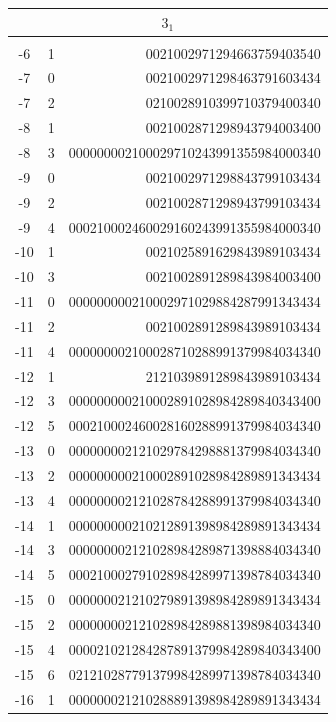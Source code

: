 \documentclass{article}
\begin{document}
\begin{supertabular}[h]{c c r}
\hline
{}     \\
\hline \\[-3pt]
-6    & 1  & 0021002971294663759403540             \\
-7    & 0  & 0021002971298463791603434             \\
-7    & 2  & 0210028910399710379400340             \\
-8    & 1  & 0021002871298943794003400             \\
-8    & 3  & 000000002100029710243991355984000340  \\
-9    & 0  & 0021002971298843799103434             \\
-9    & 2  & 0021002871298943799103434             \\
-9    & 4  & 000210002460029160243991355984000340  \\
-10   & 1  & 0021025891629843989103434             \\
-10   & 3  & 0021002891289843984003400             \\
-11   & 0  & 000000000210002971029884287991343434  \\
-11   & 2  & 0021002891289843989103434             \\
-11   & 4  & 000000002100028710288991379984034340  \\
-12   & 1  & 2121039891289843989103434             \\
-12   & 3  & 000000000210002891028984289840343400  \\
-12   & 5  & 000210002460028160288991379984034340  \\
-13   & 0  & 000000002121029784298881379984034340  \\
-13   & 2  & 000000000210002891028984289891343434  \\
-13   & 4  & 000000002121028784288991379984034340  \\
-14   & 1  & 000000000210212891398984289891343434  \\
-14   & 3  & 000000002121028984289871398884034340  \\
-14   & 5  & 000210002791028984289971398784034340  \\
-15   & 0  & 000000021210279891398984289891343434  \\
-15   & 2  & 000000002121028984289881398984034340  \\
-15   & 4  & 000021021284287891379984289840343400  \\
-15   & 6  & 021210287791379984289971398784034340  \\
-16   & 1  & 000000021210288891398984289891343434  \\

\end{supertabular}
\end{document}
